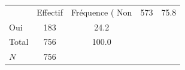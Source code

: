 {
\def\sym#1{\ifmmode^{#1}\else\(^{#1}\)\fi}
\begin{tabular}{l*{1}{cc}}
\toprule
            &    Effectif&Fréquence (%
\midrule
Non         &         573&        75.8\\
Oui         &         183&        24.2\\
Total       &         756&       100.0\\
\midrule
\(N\)       &         756&            \\
\bottomrule
\end{tabular}
}
